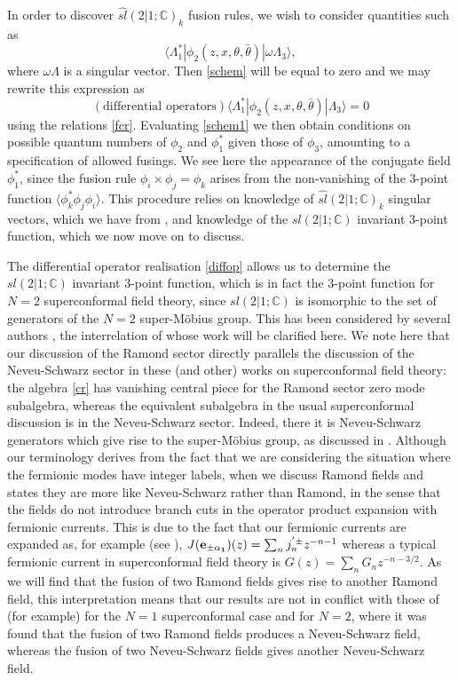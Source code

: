 \documentclass[a4paper,12pt]{article}
\def\thetabar    {\bar{\theta}}
\def\fsl         {sl(2|1;\mathbb C)}
\def\hslck       {\hat{sl}(2|1;{\mathbb C})_k}
\begin{document}
In order to discover $\hslck$ fusion rules, we wish to consider
quantities such as 
\begin{equation}
\label{schem}
\langle \Lambda^*_1 | \phi_2(z,x,\theta,\thetabar) | \omega
\Lambda_3 \rangle,
\end{equation}
where $\omega\Lambda$ is a singular vector.  Then \eqref{schem} will
be equal to zero and we may rewrite this expression as
\begin{equation}
\label{schem1}
(\textrm{differential operators})\langle \Lambda^*_1 |
\phi_2(z,x,\theta,\thetabar) | \Lambda_3 \rangle = 0
\end{equation}
using the relations \eqref{fcr}.  Evaluating \eqref{schem1} we then
obtain conditions on possible quantum numbers of $\phi_2$ and
$\phi^*_1$ given those of $\phi_3$, amounting to a specification
of allowed fusings.  We see here the appearance of the conjugate field 
$\phi^*_1$, since the fusion rule $\phi_i\times\phi_j=\phi_k$ arises from 
the non-vanishing of the 3-point function $\langle\phi^*_k\phi_j\phi_i\rangle$.
This procedure relies on knowledge of $\hslck$
singular vectors, which we have from \cite{BT97}, and knowledge of the
$\fsl$ invariant 3-point function, which we now move on to
discuss.

The differential operator realisation \eqref{diffop} allows us to
determine the $\fsl$ invariant 3-point function, which is in
fact the 3-point function for $N=2$ superconformal field theory,
since $\fsl$ is isomorphic to the set of generators of the $N=2$
super-M\"{o}bius group.  This has been considered by several authors
\cite{Kir, MSS, West, Bl}, the interrelation of whose work will be
clarified here.   We note here that our discussion
of the Ramond sector directly parallels the discussion of the
Neveu-Schwarz sector in these (and other) works on superconformal
field theory: the algebra \eqref{cr} has vanishing central piece for the
Ramond sector zero mode subalgebra, whereas the equivalent subalgebra
in the usual superconformal discussion is in the Neveu-Schwarz
sector.  Indeed, there it is Neveu-Schwarz generators which give rise to
the super-M\"{o}bius group, as discussed in \cite{West}.  Although our
terminology derives from the fact that we are considering the
situation where the fermionic modes have integer labels, when we
discuss Ramond fields and states they are more like Neveu-Schwarz
rather than Ramond, in the sense that the fields do not introduce branch
cuts in the operator product expansion with fermionic currents.  This is 
due to the fact that our fermionic currents are expanded as, for example 
(see \cite{BHT98}), 
$J({\bf e_{\pm \alpha_1}})(z)= \sum_n j_n^{'\pm}z^{-n-1}$ whereas a typical 
fermionic current in superconformal field theory is $G(z)=\sum_n G_n 
z^{-n-3/2}$.  As we
will find that the fusion of two Ramond fields gives rise to another
Ramond field, this interpretation means that our results are not in
conflict with those of (for example) \cite{Watts} for the $N=1$
superconformal case and \cite{MSS} for $N=2$, where it was found
that the fusion of two Ramond fields produces a Neveu-Schwarz field,
whereas the fusion of two Neveu-Schwarz fields gives another
Neveu-Schwarz field.  
 
\end{document}
